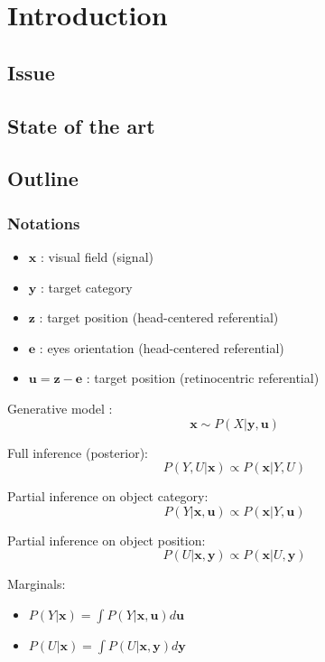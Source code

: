 \section{Introduction}

\subsection{Issue}

\subsection{State of the art}

\subsection{Outline}

\subsubsection{Notations}
\begin{itemize}
	\item $\boldsymbol{x}$ : visual field (signal)
	\item $\boldsymbol{y}$ : target category 
	\item $\boldsymbol{z}$ : target position (head-centered referential)
	\item $\boldsymbol{e}$ : eyes orientation (head-centered referential)
	\item $\boldsymbol{u} = \boldsymbol{z} - \boldsymbol{e}$ : target position (retinocentric referential)

\end{itemize}

Generative model :
$$ \boldsymbol{x} \sim P(X|\boldsymbol{y}, \boldsymbol{u}) $$

Full inference (posterior):
$$ P(Y, U|\boldsymbol{x}) \propto  P(\boldsymbol{x}|Y, U) $$


Partial inference on object category:
$$ P(Y|\boldsymbol{x}, \boldsymbol{u}) \propto  P(\boldsymbol{x}|Y, \boldsymbol{u}) $$

Partial inference on object position:
$$ P(U|\boldsymbol{x}, \boldsymbol{y}) \propto  P(\boldsymbol{x}|U, \boldsymbol{y}) $$

Marginals:
\begin{itemize}
\item $ P(Y|\boldsymbol{x}) = \int P(Y|\boldsymbol{x}, \boldsymbol{u}) d\boldsymbol{u}$
\item $ P(U|\boldsymbol{x}) = \int P(U|\boldsymbol{x}, \boldsymbol{y}) d\boldsymbol{y}$
\end{itemize}


